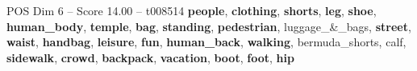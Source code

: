 \begin{textsample}{POS Dim 6 – Score 14.00 – t008514}  \label{ex:f6_pos_039}
\textbf{people}, \textbf{clothing}, \textbf{shorts}, \textbf{leg}, \textbf{shoe}, \textbf{human\_body}, \textbf{temple}, \textbf{bag}, \textbf{standing}, \textbf{pedestrian}, luggage\_\&\_bags, \textbf{street}, \textbf{waist}, \textbf{handbag}, \textbf{leisure}, \textbf{fun}, \textbf{human\_back}, \textbf{walking}, bermuda\_shorts, calf, \textbf{sidewalk}, \textbf{crowd}, \textbf{backpack}, \textbf{vacation}, \textbf{boot}, \textbf{foot}, \textbf{hip}

\end{textsample}
